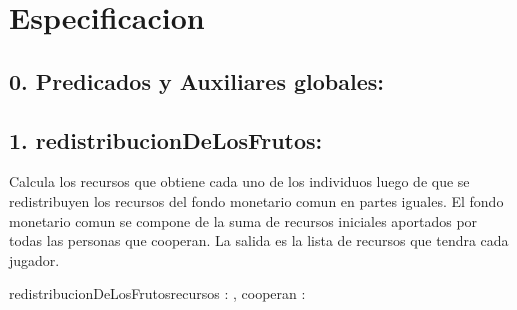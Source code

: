 \documentclass[10pt,a4paper]{article}
\begin{document}
\maketitle

\section{Especificacion}



\subsection*{0. Predicados y Auxiliares globales:}
	\hfill

		{
		}
	
	{}




\subsection*{1. redistribucionDeLosFrutos:}
	Calcula los recursos que obtiene cada uno de los individuos luego de que se redistribuyen
	los recursos del fondo monetario comun en partes iguales. El fondo monetario comun se compone de la suma de recursos
	iniciales aportados por todas las personas que cooperan. La salida es la lista de recursos que tendra cada jugador.

	\begin{proc}{redistribucionDeLosFrutos}{\In recursos : \TLista{\float}, \In cooperan : \TLista{\bool}}{\TLista{\float}}
		\hfill 
	
		{ 
		}

		\hfill 
		

		\hfill 


		

	\end{proc}
	
\end{document}
